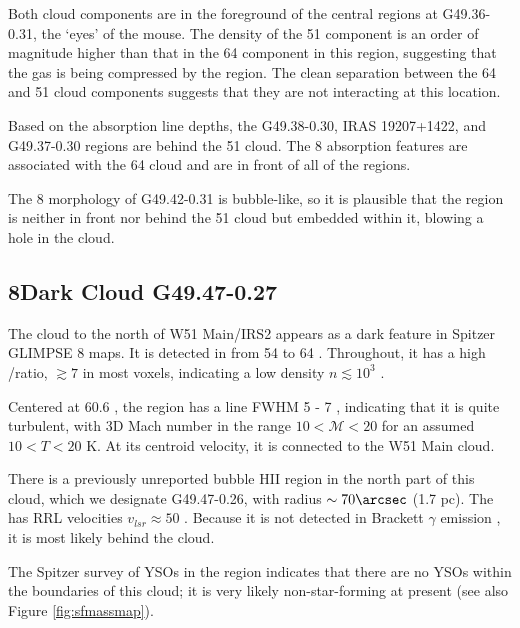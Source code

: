 Both cloud components are in the foreground of the central \hii regions at
G49.36-0.31, the `eyes' of the mouse.  The density of the 51 \kms component is
an order of magnitude higher than that in the 64 \kms component in this region,
suggesting that the gas is being compressed by the \hii region.
The clean separation between the 64 and 51 \kms cloud components suggests that
they are not interacting at this location.  

Based on the absorption line depths, the G49.38-0.30, IRAS 19207+1422, and
G49.37-0.30 \hii regions are behind the 51 \kms cloud.  The 8 \um absorption
features are associated with the 64 \kms cloud and are in front of all of the
\hii regions.

The 8 \um morphology of G49.42-0.31 is bubble-like, so it is plausible that the
\hii region is neither in front nor behind the 51 \kms cloud but embedded
within it, blowing a hole in the cloud.

\subsection{8\um Dark Cloud G49.47-0.27}
The cloud to the north of W51 Main/IRS2 appears as a dark feature in Spitzer
GLIMPSE 8 \um maps.  It is detected in \formaldehyde from 54 to 64
\kms.  Throughout, it has a high \oneone/\twotwo ratio, $\gtrsim7$ in
most voxels, indicating a low density $n\lesssim10^3$ \percc. 


Centered at 60.6 \kms, the region has a line FWHM 5 - 7 \kms, indicating that
it is quite turbulent, with 3D Mach number in the range $10 < \mathcal{M} < 20$
for an assumed $10 < T < 20$ K.  At its centroid velocity, it is connected
to the W51 Main cloud.

There is a previously unreported bubble HII region in the north part of this
cloud, which we designate G49.47-0.26, with radius $\sim70\arcsec$ (1.7 pc).
The \hii has RRL velocities $v_{lsr}\approx50$ \kms.  Because it is not detected
in Brackett $\gamma$ emission \citep[from the UWISH2
survey:][]{Froebrich2011a}, it is most likely behind the cloud.

The \citet{Kang2009a} Spitzer survey of YSOs in the region indicates that there
are no YSOs within the boundaries of this cloud; it is very likely
non-star-forming at present (see also Figure \ref{fig:sfmassmap}).


